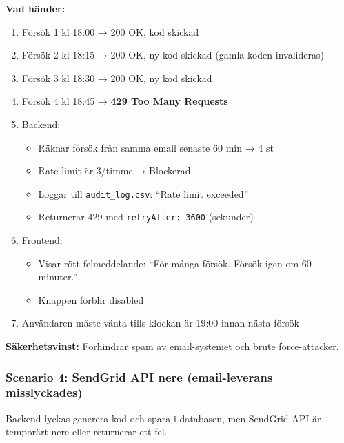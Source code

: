 \documentclass[12pt,a4paper]{article}
\begin{document}
\textbf{Vad händer:}
\begin{enumerate}[noitemsep]
  \item Försök 1 kl 18:00 → 200 OK, kod skickad
  \item Försök 2 kl 18:15 → 200 OK, ny kod skickad (gamla koden invalideras)
  \item Försök 3 kl 18:30 → 200 OK, ny kod skickad
  \item Försök 4 kl 18:45 → \textbf{429 Too Many Requests}
  \item Backend:
  \begin{itemize}[noitemsep]
    \item Räknar försök från samma email senaste 60 min → 4 st
    \item Rate limit är 3/timme → Blockerad
    \item Loggar till \texttt{audit\_log.csv}: ``Rate limit exceeded''
    \item Returnerar 429 med \texttt{retryAfter: 3600} (sekunder)
  \end{itemize}
  \item Frontend:
  \begin{itemize}[noitemsep]
    \item Visar rött felmeddelande: ``För många försök. Försök igen om 60 minuter.''
    \item Knappen förblir disabled
  \end{itemize}
  \item Användaren måste vänta tills klockan är 19:00 innan nästa försök
\end{enumerate}

\textbf{Säkerhetsvinst:} Förhindrar spam av email-systemet och brute force-attacker.

\subsubsection{Scenario 4: SendGrid API nere (email-leverans misslyckades)}

Backend lyckas generera kod och spara i databasen, men SendGrid API är temporärt nere eller returnerar ett fel.
\end{document}

